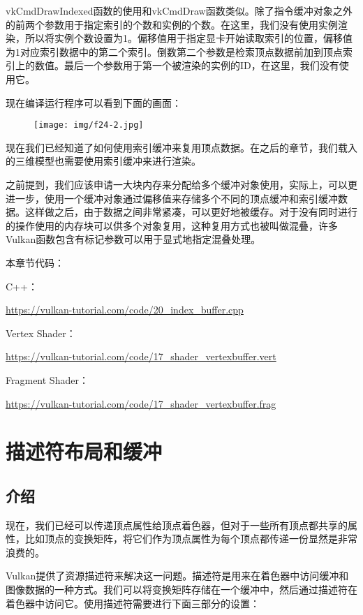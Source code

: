 \documentclass{ctexart}
\begin{document}
vkCmdDrawIndexed函数的使用和vkCmdDraw函数类似。除了指令缓冲对象之外的前两个参数用于指定索引的个数和实例的个数。在这里，我们没有使用实例渲染，所以将实例个数设置为1。偏移值用于指定显卡开始读取索引的位置，偏移值为1对应索引数据中的第二个索引。倒数第二个参数是检索顶点数据前加到顶点索引上的数值。最后一个参数用于第一个被渲染的实例的ID，在这里，我们没有使用它。

现在编译运行程序可以看到下面的画面：

\begin{figure}[H]
	\centering
	\texttt{[image: img/f24-2.jpg]}
\end{figure}

现在我们已经知道了如何使用索引缓冲来复用顶点数据。在之后的章节，我们载入的三维模型也需要使用索引缓冲来进行渲染。

之前提到，我们应该申请一大块内存来分配给多个缓冲对象使用，实际上，可以更进一步，使用一个缓冲对象通过偏移值来存储多个不同的顶点缓冲和索引缓冲数据。这样做之后，由于数据之间非常紧凑，可以更好地被缓存。对于没有同时进行的操作使用的内存块可以供多个对象复用，这种复用方式也被叫做混叠，许多Vulkan函数包含有标记参数可以用于显式地指定混叠处理。

本章节代码：

C++：

\url{https://vulkan-tutorial.com/code/20_index_buffer.cpp}

Vertex Shader：

\url{https://vulkan-tutorial.com/code/17_shader_vertexbuffer.vert}

Fragment Shader：

\url{https://vulkan-tutorial.com/code/17_shader_vertexbuffer.frag}

\newpage
\section{描述符布局和缓冲}

\subsection{介绍}

现在，我们已经可以传递顶点属性给顶点着色器，但对于一些所有顶点都共享的属性，比如顶点的变换矩阵，将它们作为顶点属性为每个顶点都传递一份显然是非常浪费的。

Vulkan提供了资源描述符来解决这一问题。描述符是用来在着色器中访问缓冲和图像数据的一种方式。我们可以将变换矩阵存储在一个缓冲中，然后通过描述符在着色器中访问它。使用描述符需要进行下面三部分的设置：
\end{document}
